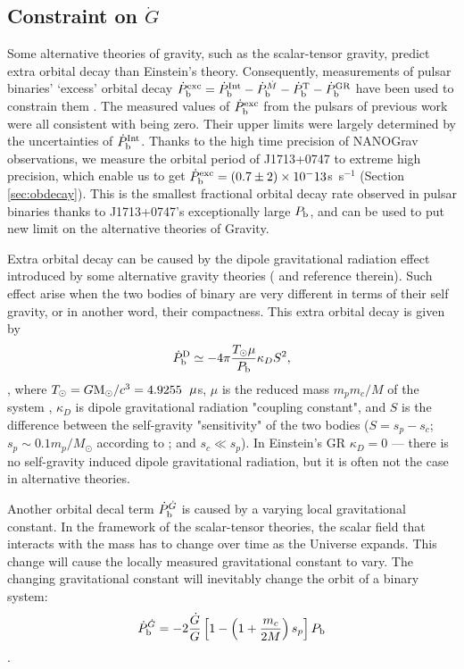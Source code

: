 \subsection{Constraint on $\dot{G}$}
\label{sec:Gdot}
Some alternative theories of gravity, such as the scalar-tensor gravity, predict extra orbital decay than Einstein's theory. 
Consequently, measurements of pulsar binaries' `excess' orbital decay
$\dot{P}_{\rm b}^{\rm exc}=\dot{P}_{\rm b}^{\rm Int} - \dot{P}_{\rm
b}^{\dot{M}}  - \dot{P}_{\rm b}^{\rm T} - \dot{P}_{\rm b}^{\rm GR}$ have been
used to constrain them \citep{lwj+09, fwe+12}. 
The measured values of $\dot{P}_{\rm b}^{\rm exc}$ from the pulsars of
previous work were all consistent with being zero. Their upper limits were largely determined by the uncertainties of $\dot{P}_{\rm b}^{\rm Int}$.
Thanks to the high time precision of NANOGrav observations, we measure the
orbital period of J1713+0747 to extreme high precision, which enable us to 
get $\dot{P}_{\rm b}^{\rm exc}=(0.7\pm2)\times10^-13$s~s$^{-1}$ (Section
\ref{sec:obdecay}). 
This is the smallest fractional orbital decay rate observed in pulsar binaries
thanks to J1713+0747's exceptionally large $P_{\rm b}$, and can be used to put new limit on
the alternative theories of Gravity.

Extra orbital decay can be caused by the dipole gravitational radiation effect
introduced by some alternative gravity theories (\citealt{Will93, Will01, lwj+09, fwe+12} and reference therein). Such effect arise when the two bodies of binary are very different in terms of their self gravity, or in another word, their compactness.
This extra orbital decay is given by 
\begin{equation}
\dot{P}_{\rm b}^{\rm D} \simeq -4\pi\frac{T_{\odot}\mu}{P_{\rm b}}\kappa_D S^2,
\end{equation}
\citep{lwj+09}, where $T_{\odot}=G{\rm M_{\odot}}/c^3=4.9255$~${\rm \mu}$s, $\mu$ is the reduced mass $m_pm_c/M$ of the system , $\kappa_D $ is dipole
gravitational radiation "coupling constant", and $S$ is the difference
between the self-gravity "sensitivity" of the two bodies ($S = s_p - s_c$;
$s_p\sim0.1m_p/M_{\odot}$ according to \citealt{de92} ; and $s_c\ll s_p$).
In Einstein's GR $\kappa_D=0$ --- there is no self-gravity induced
dipole gravitational radiation, but it is often not the case in alternative
theories.

Another orbital decal term $\dot{P}_{\rm b}^{\dot{G}}$ is caused by a varying
local gravitational constant. In the framework of the scalar-tensor theories,
the scalar field that interacts with the mass has to change over time as the
Universe expands. This change will cause the locally measured gravitational
constant to vary. The changing gravitational constant will inevitably change
the orbit of a binary system:
\begin{equation}
\dot{P}_{\rm b}^{\dot{G}} = -2 \frac{\dot{G}}{G}
\left[1-\left(1+\frac{m_c}{2M}\right)s_p\right]P_{\rm b}
\end{equation}
\citep{dgt88,nor90}.

